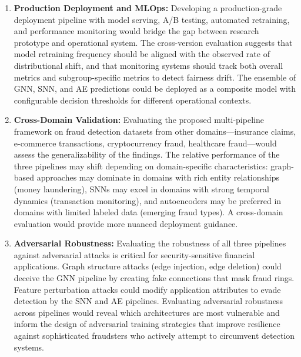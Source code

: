 \begin{enumerate}[label=\arabic*.]
\item \textbf{Production Deployment and MLOps:} Developing a production-grade deployment pipeline with model serving, A/B testing, automated retraining, and performance monitoring would bridge the gap between research prototype and operational system. The cross-version evaluation suggests that model retraining frequency should be aligned with the observed rate of distributional shift, and that monitoring systems should track both overall metrics and subgroup-specific metrics to detect fairness drift. The ensemble of GNN, SNN, and AE predictions could be deployed as a composite model with configurable decision thresholds for different operational contexts.

\item \textbf{Cross-Domain Validation:} Evaluating the proposed multi-pipeline framework on fraud detection datasets from other domains---insurance claims, e-commerce transactions, cryptocurrency fraud, healthcare fraud---would assess the generalizability of the findings. The relative performance of the three pipelines may shift depending on domain-specific characteristics: graph-based approaches may dominate in domains with rich entity relationships (money laundering), SNNs may excel in domains with strong temporal dynamics (transaction monitoring), and autoencoders may be preferred in domains with limited labeled data (emerging fraud types). A cross-domain evaluation would provide more nuanced deployment guidance.

\item \textbf{Adversarial Robustness:} Evaluating the robustness of all three pipelines against adversarial attacks is critical for security-sensitive financial applications. Graph structure attacks (edge injection, edge deletion) could deceive the GNN pipeline by creating fake connections that mask fraud rings. Feature perturbation attacks could modify application attributes to evade detection by the SNN and AE pipelines. Evaluating adversarial robustness across pipelines would reveal which architectures are most vulnerable and inform the design of adversarial training strategies that improve resilience against sophisticated fraudsters who actively attempt to circumvent detection systems.
\end{enumerate}

